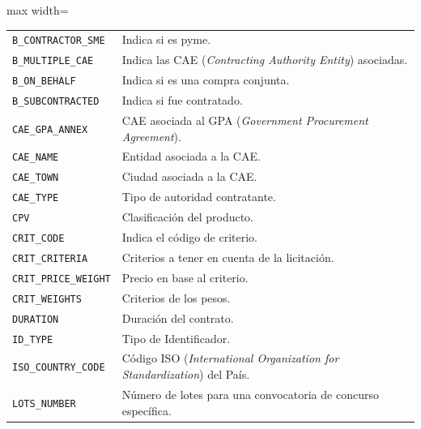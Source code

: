 \documentclass[a4paper,fleqn]{cas-sc}
\begin{document}
\begin{table}[t]
\begin{adjustbox}{max width=\textwidth}
\begin{tabular}{ll}
	\texttt{B\_CONTRACTOR\_SME}    & Indica si es pyme. \\	
	\texttt{B\_MULTIPLE\_CAE}      & Indica las CAE (\textit{Contracting Authority Entity}) asociadas.\\
	\texttt{B\_ON\_BEHALF}         & Indica si es una compra conjunta.  \\	
	\texttt{B\_SUBCONTRACTED}      & Indica si fue contratado. \\
\texttt{CAE\_GPA\_ANNEX}       & CAE asociada al GPA (\textit{Government Procurement Agreement}). \\
	\texttt{CAE\_NAME}             & Entidad asociada a la CAE. \\
	\texttt{CAE\_TOWN}             & Ciudad asociada a la CAE. \\
	\texttt{CAE\_TYPE}             & Tipo de autoridad contratante. \\
	\texttt{CPV}                             & Clasificación del producto. \\
	\texttt{CRIT\_CODE}            & Indica el código de criterio. \\
	\texttt{CRIT\_CRITERIA}        & Criterios a tener en cuenta de la licitación. \\
	\texttt{CRIT\_PRICE\_WEIGHT}   & Precio en base al criterio. \\
	\texttt{CRIT\_WEIGHTS}         & Criterios de los pesos. \\
	\texttt{DURATION}              & Duración del contrato. \\
	\texttt{ID\_TYPE}              & Tipo de Identificador. \\
\texttt{ISO\_COUNTRY\_CODE}    & Código ISO (\textit{International Organization for Standardization}) del País. \\
	\texttt{LOTS\_NUMBER}          & Número de lotes para una convocatoria de concurso específica.\\

\end{tabular}
\end{adjustbox}
\end{table}
\end{document}
